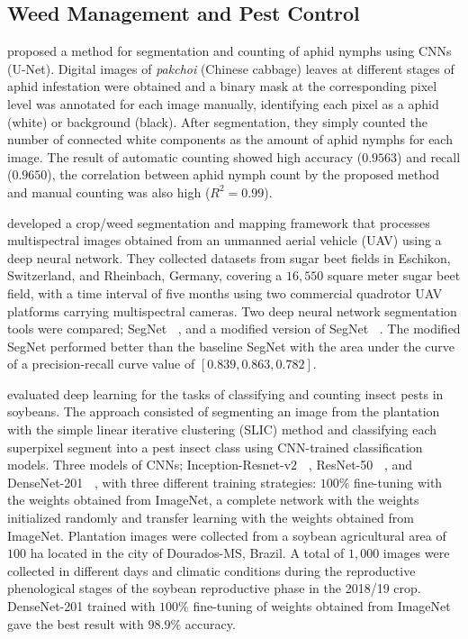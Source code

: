 \documentclass[12pt]{report}
\numberwithin{equation}{section}
\begin{document}
\subsection{Weed Management and Pest Control}
\textbf{\cite{chen2018automatic}} proposed a method for segmentation and counting of aphid nymphs using CNNs (U-Net). Digital images of \textit{pakchoi} (Chinese cabbage) leaves at different stages of aphid infestation were obtained and a binary mask at the corresponding pixel level was annotated for each image manually, identifying each pixel as a aphid (white) or background (black). After segmentation, they simply counted the number of connected white components as the amount of aphid nymphs for each image. The result of automatic counting showed high accuracy ($0.9563$) and recall ($0.9650$), the correlation between aphid nymph count by the proposed method and manual counting was also high ($R^2 = 0.99$). 

\textbf{\cite{sa2018weedmap}} developed a crop/weed segmentation and
mapping framework that processes multispectral images obtained from an unmanned aerial vehicle (UAV) using a deep neural network. They collected datasets from sugar beet fields in Eschikon, Switzerland, and Rheinbach, Germany, covering a $16,550$ square meter sugar beet field, with a time interval of five months using two commercial quadrotor UAV platforms carrying multispectral cameras. Two deep neural network segmentation tools were compared; SegNet \textbf{~\cite{garcia2017review}}, and a modified version of  SegNet \textbf{~\cite{badrinarayanan2017segnet}}. The modified SegNet performed better than the baseline SegNet with  the area under the curve  of a precision-recall curve value of $[0.839, 0.863, 0.782]$.

\textbf{\cite{tetila2019deep}} evaluated deep learning for the tasks of classifying and counting insect pests in soybeans. The approach consisted of segmenting an image from the plantation with the simple linear iterative clustering (SLIC) method and classifying each superpixel segment into a pest insect class  using CNN-trained classification models. Three models of CNNs; Inception-Resnet-v2 \textbf{~\cite{Szegedy}}, ResNet-50 \textbf{~\cite{He2015DeepRL}}, and DenseNet-201 \textbf{~\cite{huang2017densely}}, with three different training strategies: $100\%$ fine-tuning with the weights obtained from ImageNet, a complete network with the weights initialized randomly and transfer learning with the weights obtained from ImageNet. Plantation images were collected from a soybean agricultural area of $100$ ha located in the city of Dourados-MS, Brazil. A total of $1,000$ images were collected in different days and climatic conditions  during the reproductive phenological stages  of the soybean reproductive phase in the 2018/19 crop. DenseNet-201 trained with $100\%$ fine-tuning of weights obtained from ImageNet gave the best result with $98.9\%$ accuracy.
\end{document}

